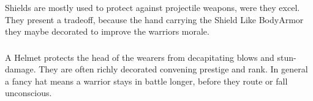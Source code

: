 \Glspl*{Shield} are mostly used to protect against projectile weapons, were they excel.
They present a tradeoff, because the hand carrying the \gls*{Shield}
Like \gls{BodyArmor} they maybe decorated to improve the warriors morale.

\subsubsection{}\label{ch:Goods:Armory:Armor:Helmet}

A \gls*{Helmet} protects the head of the wearers from decapitating blows and
stun-damage. They are often richly decorated convening prestige and rank. In
general a fancy hat means a warrior stays in battle longer, before they route
or fall unconscious.
